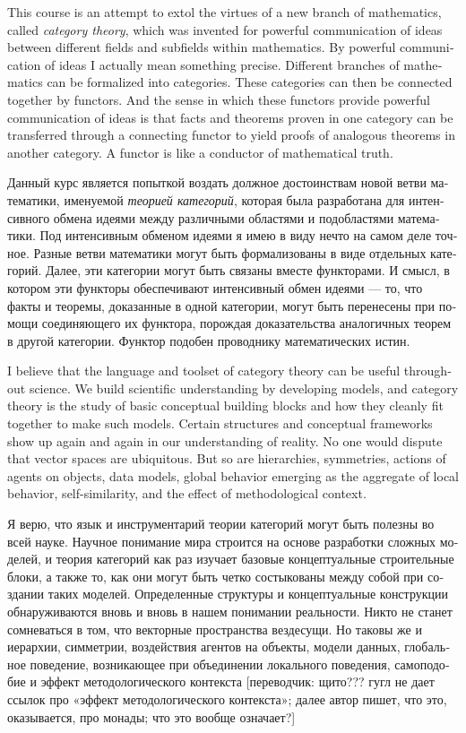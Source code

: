 \documentclass[a4paper]{book}
\theoremstyle{myth}
\begin{document}
\begin{english}
This course is an attempt to extol the virtues of a new branch of mathematics, called {\em category theory}, which was invented for powerful communication of ideas between different fields and subfields within mathematics. By powerful communication of ideas I actually mean something precise. Different branches of mathematics can be formalized into categories. These categories can then be connected together by functors. And the sense in which these functors provide powerful communication of ideas is that facts and theorems proven in one category can be transferred through a connecting functor to yield proofs of analogous theorems in another category. A functor is like a conductor of mathematical truth.

\begin{russian}Данный курс является попыткой воздать должное достоинствам новой ветви математики, именуемой {\em теорией категорий}, которая была разработана для интенсивного обмена идеями между различными областями и подобластями математики. Под интенсивным обменом идеями я имею в виду нечто на самом деле точное. Разные ветви математики могут быть формализованы в виде отдельных категорий. Далее, эти категории могут быть связаны вместе функторами. И смысл, в котором эти функторы обеспечивают интенсивный обмен идеями — то, что факты и теоремы, доказанные в одной категории, могут быть перенесены при помощи соединяющего их функтора, порождая доказательства аналогичных теорем в другой категории. Функтор подобен проводнику математических истин. \end{russian}

I believe that the language and toolset of category theory can be useful throughout science. We build scientific understanding by developing models, and category theory is the study of basic conceptual building blocks and how they cleanly fit together to make such models. Certain structures and conceptual frameworks show up again and again in our understanding of reality. No one would dispute that vector spaces are ubiquitous. But so are hierarchies, symmetries, actions of agents on objects, data models, global behavior emerging as the aggregate of local behavior, self-similarity, and the effect of methodological context.

\begin{russian}Я верю, что язык и инструментарий теории категорий могут быть полезны во всей науке. Научное понимание мира строится на основе разработки сложных моделей, и теория категорий как раз изучает базовые концептуальные строительные блоки, а также то, как они могут быть четко состыкованы между собой при создании таких моделей. Определенные структуры и концептуальные конструкции обнаруживаются вновь и вновь в нашем понимании реальности. Никто не станет сомневаться в том, что векторные пространства вездесущи. Но таковы же и иерархии, симметрии, воздействия агентов на объекты, модели данных, глобальное поведение, возникающее при объединении локального поведения, самоподобие и эффект методологического контекста [переводчик: щито??? гугл не дает ссылок про «эффект методологического контекста»; далее автор пишет, что это, оказывается, про монады; что это вообще означает?] \end{russian}


\end{english}
\end{document}
